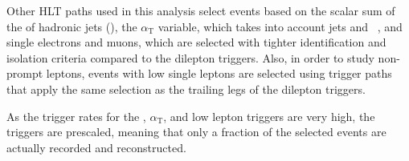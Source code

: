 Other HLT paths used in this analysis select events based on the scalar sum of the \pt of hadronic jets (\HT), the $\alpha_{\mathrm{T}}$ variable, which takes into account jets and \MET~\cite{Khachatryan2011196}, and single electrons and muons, which are selected with tighter identification and isolation criteria compared to the dilepton triggers. Also, in order to study non-prompt leptons, events with low \pt single leptons are selected using trigger paths that apply the same selection as the trailing legs of the dilepton triggers. 

As the trigger rates for the \HT, $\alpha_{\mathrm{T}}$, and low \pt lepton triggers are very high, the triggers are prescaled, meaning that only a fraction of the selected events are actually recorded and reconstructed.

  


